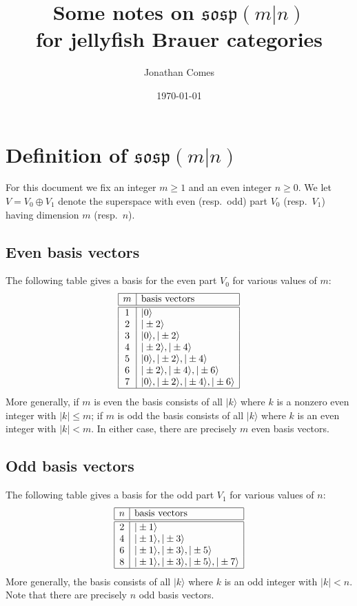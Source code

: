 \documentclass{amsart}
\begin{document}
\title{Some notes on $\mathfrak{sosp}(m|n)$\\ for jellyfish Brauer categories}
\author{Jonathan Comes}
\date{\today}

\maketitle 

\section{Definition of $\mathfrak{sosp}(m|n)$} 

For this document we fix an integer $m\geq 1$ and an even integer $n\geq 0$. We let $V=V_0\oplus V_1$ denote the superspace with even (resp.~odd) part $V_0$ (resp.~$V_1$) having dimension $m$ (resp.~$n$). 

\subsection{Even basis vectors}

The following table gives a basis for the even part $V_0$ for various values of $m$:
\[\begin{array}{|c|l|}
\hline
m & \text{basis vectors}\\
\hline
\hline
1 & |0\rangle \\
2 & |\pm2\rangle\\
3 & |0\rangle, |\pm2\rangle\\
4 & |\pm2\rangle, |\pm4\rangle\\
5 & |0\rangle, |\pm2\rangle, |\pm4\rangle\\
6 & |\pm2\rangle, |\pm4\rangle, |\pm6\rangle\\
7 & |0\rangle, |\pm2\rangle, |\pm4\rangle, |\pm6\rangle\\
\hline
\end{array}\]
More generally, if $m$ is even the basis consists of all $|k\rangle$ where $k$ is a nonzero even integer with $|k|\leq m$; if $m$ is odd the basis consists of all $|k\rangle$ where $k$ is an even integer with $|k|< m$. In either case, there are precisely $m$ even basis vectors.

\subsection{Odd basis vectors}

The following table gives a basis for the odd part $V_1$ for various values of $n$:
\[\begin{array}{|c|l|}
\hline
n & \text{basis vectors}\\
\hline
\hline
2 & |\pm 1\rangle \\
4 & |\pm1\rangle, |\pm3\rangle\\
6 & |\pm1\rangle, |\pm3\rangle, |\pm5\rangle\\
8 & |\pm1\rangle, |\pm3\rangle, |\pm5\rangle, |\pm7\rangle\\
\hline
\end{array}\]
More generally, the basis consists of all $|k\rangle$ where $k$ is an odd integer with $|k|< n$. Note that there are precisely $n$ odd basis vectors.
\end{document}
